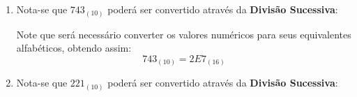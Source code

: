 \documentclass{article}
\begin{document}
\begin{resolution}
\begin{enumerate}[rightmargin = \leftmargin]
                    \item Nota-se que $743_{(10)}$ poderá ser convertido através da \textbf{Divisão Sucessiva}:
                        \begin{figure}[H]
                            \centering
                        \end{figure}
                    Note que será necessário converter os valores numéricos para seus equivalentes alfabéticos, obtendo assim:
                        \begin{equation*}
                            \boxed{743_{(10)} = 2E7_{(16)}}
                        \end{equation*}

                    \item Nota-se que $221_{(10)}$ poderá ser convertido através da \textbf{Divisão Sucessiva}:
                        \begin{figure}[H]
                            \centering
                        \end{figure}
                \end{enumerate}
            \end{resolution}
\newpage
\end{document}
